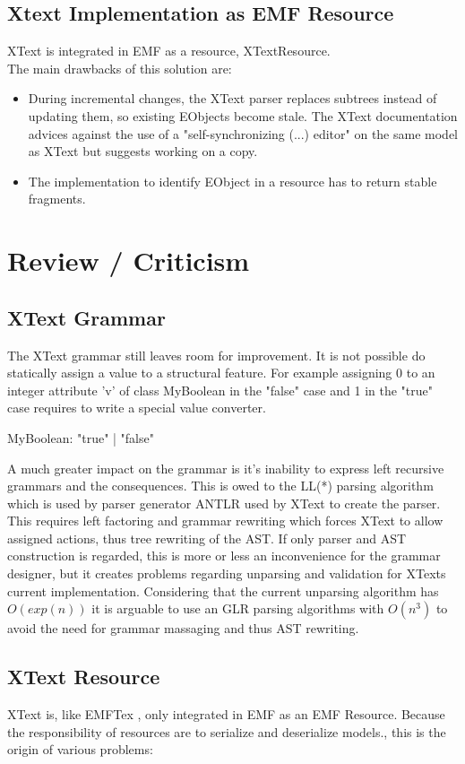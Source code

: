 \subsection{Xtext Implementation as EMF  Resource}
XText is integrated in EMF as a resource, XTextResource.\\
The main drawbacks of this solution are:
\begin{itemize}
	\item During incremental changes, the XText parser replaces subtrees instead of updating them, so existing EObjects become stale. The XText documentation advices against the use of a "self-synchronizing (...) editor" on the same model as XText but suggests working on a copy.
	\item The implementation to identify EObject in a resource has to return stable fragments.
\end{itemize}

\section{Review / Criticism}
\subsection{XText Grammar}
The XText grammar still leaves room for improvement. It is not possible do statically assign a value  to a structural feature. For example assigning 0 to an integer attribute 'v' of class MyBoolean in the "false" case and 1 in the "true" case requires to write a special value converter. 
\begin{xtxt}
MyBoolean:  "true" | "false"
\end{xtxt}

A much greater impact on the grammar is it's inability to express left recursive grammars and the consequences. This is owed to the LL(*) parsing algorithm which is used by parser generator ANTLR used by XText to create the parser. This requires left factoring and grammar rewriting which forces XText to allow assigned actions, thus tree rewriting of the AST. If only parser and AST construction is regarded, this is more or less an inconvenience for the grammar designer, but it creates problems regarding unparsing and validation for XTexts current implementation. Considering that the current unparsing algorithm has $O(exp(n))$ it is arguable to use an GLR parsing algorithms with  $O(n^3)$ to avoid the need for grammar massaging and thus AST rewriting.

\subsection{XText Resource}
XText is, like EMFTex \cite{EMFTextMan}, only integrated in EMF as an EMF Resource. Because the responsibility of resources are to serialize and deserialize models., this is the origin of various problems: 

